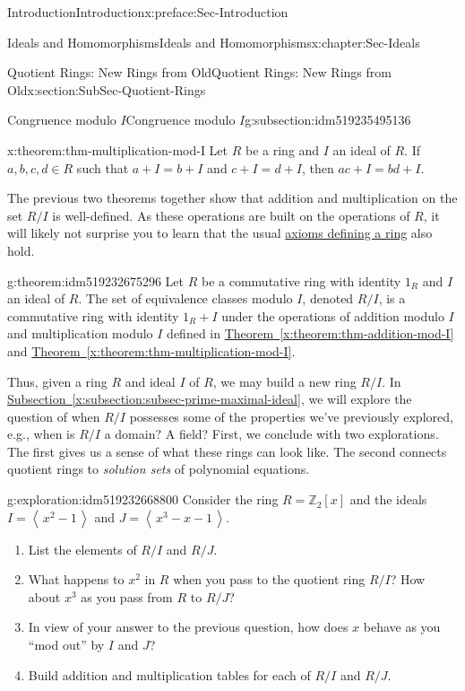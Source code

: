 \documentclass[oneside,10pt,]{book}
\newcommand{\xreffont}{\relax}
\numberwithin{equation}{section}
\newcommand{\ideal}[1]{\left\langle\, #1 \,\right\rangle}
\def\Z{{\mathbb Z}}
\begin{document}
\begin{preface}{Introduction}{}{Introduction}{}{}{x:preface:Sec-Introduction}
\begin{chapterptx}{Ideals and Homomorphisms}{}{Ideals and Homomorphisms}{}{}{x:chapter:Sec-Ideals}
\begin{sectionptx}{Quotient Rings: New Rings from Old}{}{Quotient Rings: New Rings from Old}{}{}{x:section:SubSec-Quotient-Rings}
\begin{subsectionptx}{Congruence modulo \(I\)}{}{Congruence modulo \(I\)}{}{}{g:subsection:idm519235495136}
\begin{theorem}{}{}{x:theorem:thm-multiplication-mod-I}
Let \(R\) be a ring and \(I\) an ideal of \(R\). If \(a,b,c,d\in R\) such that \(a+I = b+I\) and \(c+I = d+I\), then \(ac + I = bd + I\).%
\end{theorem}
The previous two theorems together show that addition and multiplication on the set \(R/I\) is well-defined. As these operations are built on the operations of \(R\), it will likely not surprise you to learn that the usual \hyperref[x:definition:def_ring]{axioms defining a ring} also hold.%
\begin{theorem}{}{}{g:theorem:idm519232675296}%
%
Let \(R\) be a commutative ring with identity \(1_R\) and \(I\) an ideal of \(R\). The set of equivalence classes modulo \(I\), denoted \(R/I\), is a commutative ring with identity \(1_R + I\) under the operations of addition modulo \(I\) and multiplication modulo \(I\) defined in \hyperref[x:theorem:thm-addition-mod-I]{Theorem~{\xreffont\ref{x:theorem:thm-addition-mod-I}}} and \hyperref[x:theorem:thm-multiplication-mod-I]{Theorem~{\xreffont\ref{x:theorem:thm-multiplication-mod-I}}}.%
\end{theorem}
Thus, given a ring \(R\) and ideal \(I\) of \(R\), we may build a new ring \(R/I\). In \hyperref[x:subsection:subsec-prime-maximal-ideal]{Subsection~{\xreffont\ref{x:subsection:subsec-prime-maximal-ideal}}}, we will explore the question of when \(R/I\) possesses some of the properties we've previously explored, e.g., when is \(R/I\) a domain? A field? First, we conclude with two explorations. The first gives us a sense of what these rings can look like. The second connects quotient rings to \emph{solution sets} of polynomial equations.%
\begin{exploration}{}{g:exploration:idm519232668800}%
Consider the ring \(R=\Z_2[x]\) and the ideals \(I = \ideal{x^2-1}\) and \(J = \ideal{x^3 -x -1}\).%
%
\begin{enumerate}
\item{}List the elements of \(R/I\) and \(R/J\).%
\item{}What happens to \(x^2\) in \(R\) when you pass to the quotient ring \(R/I\)? How about \(x^3\) as you pass from \(R\) to \(R/J\)?%
\item{}In view of your answer to the previous question, how does \(x\) behave as you ``mod out'' by \(I\) and \(J\)?%
\item{}Build addition and multiplication tables for each of \(R/I\) and \(R/J\).%
\end{enumerate}
\end{exploration}

\end{subsectionptx}
\end{sectionptx}
\end{chapterptx}
\end{preface}
\end{document}
